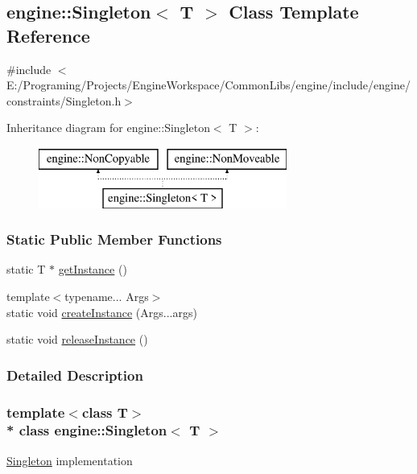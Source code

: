\hypertarget{a00069}{}\subsection{engine\+:\+:Singleton$<$ T $>$ Class Template Reference}
\label{a00069}


{\ttfamily \#include $<$E\+:/\+Programing/\+Projects/\+Engine\+Workspace/\+Common\+Libs/engine/include/engine/constraints/\+Singleton.\+h$>$}

Inheritance diagram for engine\+:\+:Singleton$<$ T $>$\+:\begin{figure}[H]
\begin{center}
\leavevmode
\includegraphics[height=2.000000cm]{a00069}
\end{center}
\end{figure}
\subsubsection*{Static Public Member Functions}
\begin{DoxyCompactItemize}
\item 
static T $\ast$ \hyperlink{a00069_a90ed1f21b1811a569eafccc78fcd12ca}{get\+Instance} ()
\item 
{\footnotesize template$<$typename... Args$>$ }\\static void \hyperlink{a00069_a571e434c8ff771bf65de40f8a7b22076}{create\+Instance} (Args...\+args)
\item 
static void \hyperlink{a00069_a3fbed1f6a78cdf1d0c11467a3be61841}{release\+Instance} ()
\end{DoxyCompactItemize}


\subsubsection{Detailed Description}
\subsubsection*{template$<$class T$>$\\*
class engine\+::\+Singleton$<$ T $>$}

\hyperlink{a00069}{Singleton} implementation 

